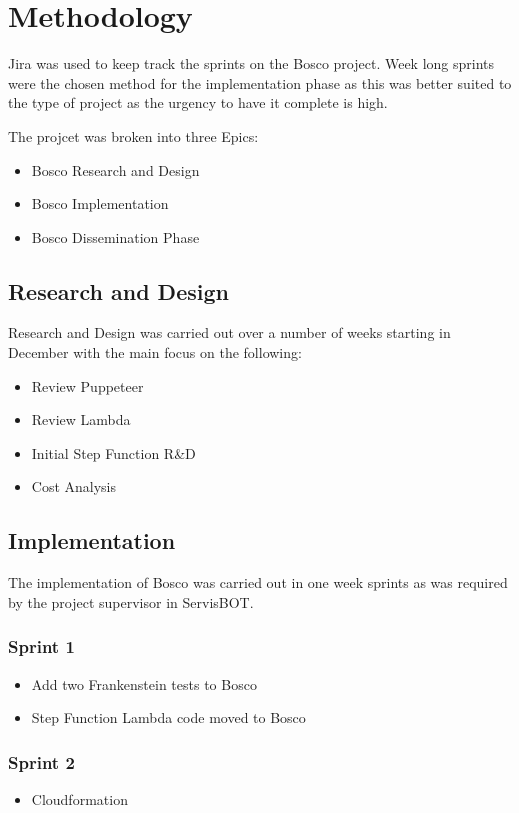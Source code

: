 \documentclass[12pt,a4paper,titlepage]{report}
\begin{document}
\appendix
\chapter{Methodology}
Jira was used to keep track the sprints on the Bosco project. Week long sprints were the chosen method for the implementation phase as this
was better suited to the type of project as the urgency to have it complete is high.

The projcet was broken into three Epics:

\begin{itemize}
  \item Bosco Research and Design
  \item Bosco Implementation
  \item Bosco Dissemination Phase
\end{itemize}
\section{Research and Design}
Research and Design was carried out over a number of weeks starting in December with the main focus on the following:
\begin{itemize}
\item Review Puppeteer
\item Review Lambda
\item Initial Step Function R\&D
\item Cost Analysis
\end{itemize}

\section{Implementation}
The implementation of Bosco was carried out in one week sprints as was required by the project supervisor in ServisBOT\@. 
\subsection*{Sprint 1}
\begin{itemize}
\item Add two Frankenstein tests to Bosco
\item Step Function Lambda code moved to Bosco
\end{itemize}

\subsection*{Sprint 2}
\begin{itemize}
\item Cloudformation
\end{itemize}
\end{document}
